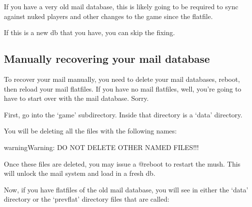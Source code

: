 \documentclass[letterpaper,10pt,english]{sphinxmanual}
\begin{document}
\sphinxAtStartPar
If you have a very old mail database, this is likely going to be required
to sync against nuked players and other changes to the game since the flatfile.

\sphinxAtStartPar
If this is a new db that you have, you can skip the fixing.


\subsection{Manually recovering your mail database}
\label{\detokenize{troubleshooting:manually-recovering-your-mail-database}}
\sphinxAtStartPar
To recover your mail manually, you need to delete your mail databases,
reboot, then reload your mail flatfiles.  If you have no mail flatfiles,
well, you’re going to have to start over with the mail database.  Sorry.

\sphinxAtStartPar
First, go into the ‘game’ subdirectory.  Inside that directory is a ‘data’
directory.

\sphinxAtStartPar
You will be deleting all the files with the following names:

\begin{sphinxVerbatim}[commandchars=\\\{\}]
                 
               
\end{sphinxVerbatim}

\begin{sphinxadmonition}{warning}{Warning:}
\sphinxAtStartPar
DO NOT DELETE OTHER NAMED FILES!!!
\end{sphinxadmonition}

\sphinxAtStartPar
Once these files are deleted, you may issue a @reboot to restart the mush.
This will unlock the mail system and load in a fresh db.

\sphinxAtStartPar
Now, if you have flatfiles of the old mail database, you will see in either
the ‘data’ directory or the ‘prevflat’ directory files that are called:

\begin{sphinxVerbatim}[commandchars=\\\{\}]
\end{sphinxVerbatim}
\end{document}
